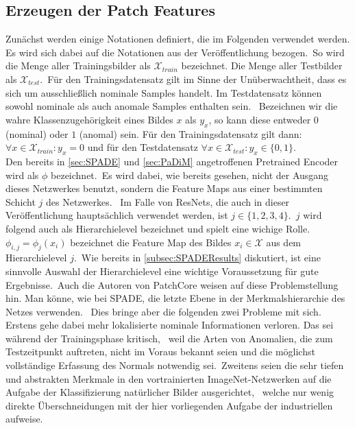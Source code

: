 \subsection{Erzeugen der Patch Features}\label{subsec:ErzeugenDerPatchFeatures}
Zunächst werden einige Notationen definiert, die im Folgenden verwendet werden. Es wird sich dabei auf die Notationen aus der Veröffentlichung bezogen.\
So wird die Menge aller Trainingsbilder als $\mathcal{X}_{train}$ bezeichnet. Die Menge aller Testbilder als $\mathcal{X}_{test}$.\
Für den Trainingsdatensatz gilt im Sinne der Unüberwachtheit, dass es sich um ausschließlich nominale Samples handelt. Im Testdatensatz können sowohl nominale als auch anomale Samples enthalten sein.\
Bezeichnen wir die wahre Klassenzugehörigkeit eines Bildes $x$ als $y_{x}$, so kann diese entweder $0$ (nominal) oder $1$ (anomal) sein. Für den Trainingsdatensatz gilt dann:\
$\forall x \in \mathcal{X}_{train}: y_{x} = 0$ und für den Testdatensatz $\forall x \in \mathcal{X}_{test}: y_{x} \in \{0,1\}$.\\
Den bereits in \ref{sec:SPADE} und \ref{sec:PaDiM} angetroffenen \glqq Pretrained Encoder\grqq{} wird als $\phi$ bezeichnet.\
Es wird dabei, wie bereits gesehen, nicht der Ausgang dieses Netzwerkes benutzt, sondern die Feature Maps aus einer bestimmten Schicht $j$ des Netzwerkes. \
Im Falle von ResNets, die auch in dieser Veröffentlichung hauptsächlich verwendet werden, ist $j\in \{1,2,3,4\}$.\ 
$j$ wird folgend auch als \glqq Hierarchielevel\grqq{} bezeichnet und spielt eine wichige Rolle.\
$\phi_{i,j} = \phi_{j}(x_{i})$ bezeichnet die Feature Map des Bildes $x_{i}\in \mathcal{X}$ aus dem Hierarchielevel $j$.\
Wie bereits in \ref{subsec:SPADEResults} diskutiert, ist eine sinnvolle Auswahl der Hierarchielevel eine wichtige Voraussetzung für gute Ergebnisse.\
Auch die Autoren von PatchCore weisen auf diese Problemstellung hin. Man könne, wie bei SPADE, die letzte Ebene in der Merkmalshierarchie des Netzes verwenden. \
Dies bringe aber die folgenden zwei Probleme mit sich. Erstens gehe dabei mehr lokalisierte nominale Informationen verloren. Das sei während der Trainingsphase kritisch, \
weil die Arten von Anomalien, die zum Testzeitpunkt auftreten, nicht im Voraus bekannt seien und die möglichst vollständige Erfassung des Normals notwendig sei.\
Zweitens seien die sehr tiefen und abstrakten Merkmale in den vortrainierten ImageNet-Netzwerken auf die Aufgabe der Klassifizierung natürlicher Bilder ausgerichtet, \ 
welche nur wenig direkte Überschneidungen mit der hier vorliegenden Aufgabe der industriellen aufweise. \

